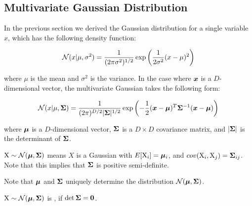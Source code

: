 \begin{tcolorbox}
    \section{Multivariate Gaussian Distribution}
    
    In the previous section we derived the Gaussian distribution for a single variable $x$, which has the following density function: 
    
    \begin{equation}
    {\mathcal{N}}(x | \mu, \sigma^2) = \frac{1}{(2 \pi \sigma^2)^{1/2}} \exp \left( \frac{1}{2\sigma^2} (x - \mu)^2 \right) \label{eq:single-gaussian}
    \end{equation}
    
    where $\mu$ is the mean and $\sigma^2$ is the variance. In the case where ${\bm{x}}$ is a $D$-dimensional vector, the multivariate Gaussian takes the following form:
    
    \begin{equation}
    {\mathcal{N}}(x | \mu, {\bm{\Sigma}}) = \frac{1}{(2 \pi)^{D/2} |{\bm{\Sigma}}|^{1/2}} \exp \left( -\frac{1}{2} ({\bm{x}} - {\bm{\mu}})^T {\bm{\Sigma}}^{-1} ({\bm{x}} - {\bm{\mu}}) \right) \label{eq:multi-gaussian}
    \end{equation}
    
    where ${\bm{\mu}}$ is a $D$-dimensional vector, ${\bm{\Sigma}}$ is a $D \times D$ covariance matrix, and $|{\bm{\Sigma}}|$ is the determinant of ${\bm{\Sigma}}$.
\end{tcolorbox}


\begin{defn}
${\textnormal{X}} \sim {\mathcal{N}}({\bm{\mu}}, {\bm{\Sigma}})$ means $X$ is a Gaussian with $E[{\textnormal{X}}_i] = {\bm{\mu}}_i$, and $cov({\textnormal{X}}_i, {\textnormal{X}}_j) = {\bm{\Sigma}}_{ij}$. Note that this implies that ${\bm{\Sigma}}$ is positive semi-definite.
\end{defn}

Note that ${\bm{\mu}}$ and ${\bm{\Sigma}}$ uniquely determine the distribution ${\mathcal{N}}({\bm{\mu}}, {\bm{\Sigma}})$. 

\begin{defn}
${\textnormal{X}} \sim {\mathcal{N}}({\bm{\mu}}, {\bm{\Sigma}})$ is , if $\det {\bm{\Sigma}} = {\bm{0}}$.
\end{defn}


